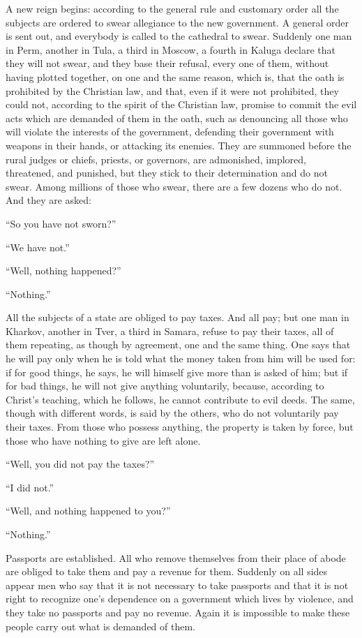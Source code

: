 \documentclass{book}
\begin{document}
A new reign begins: according to the general rule and customary order all the subjects are ordered to swear allegiance to the new government. A general order is sent out, and everybody is called to the cathedral to swear. Suddenly one man in Perm, another in Tula, a third in Moscow, a fourth in Kaluga declare that they will not swear, and they base their refusal, every one of them, without having plotted together, on one and the same reason, which is, that the oath is prohibited by the Christian law, and that, even if it were not prohibited, they could not, according to the spirit of the Christian law, promise to commit the evil acts which are demanded of them in the oath, such as denouncing all those who will violate the interests of the government, defending their government with weapons in their hands, or attacking its enemies. They are summoned before the rural judges or chiefs, priests, or governors, are admonished, implored, threatened, and punished, but they stick to their determination and do not swear. Among millions of those who swear, there are a few dozens who do not. And they are asked:

“So you have not sworn?”

“We have not.”

“Well, nothing happened?”

“Nothing.”

All the subjects of a state are obliged to pay taxes. And all pay; but one man in Kharkov, another in Tver, a third in Samara, refuse to pay their taxes, all of them repeating, as though by agreement, one and the same thing. One says that he will pay only when he is told what the money taken from him will be used for: if for good things, he says, he will himself give more than is asked of him; but if for bad things, he will not give anything voluntarily, because, according to Christ’s teaching, which he follows, he cannot contribute to evil deeds. The same, though with different words, is said by the others, who do not voluntarily pay their taxes. From those who possess anything, the property is taken by force, but those who have nothing to give are left alone.

“Well, you did not pay the taxes?”

“I did not.”

“Well, and nothing happened to you?”

“Nothing.”

Passports are established. All who remove themselves from their place of abode are obliged to take them and pay a revenue for them. Suddenly on all sides appear men who say that it is not necessary to take passports and that it is not right to recognize one’s dependence on a government which lives by violence, and they take no passports and pay no revenue. Again it is impossible to make these people carry out what is demanded of them.
\end{document}
